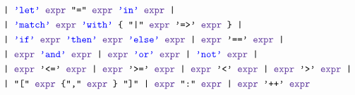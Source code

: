 \documentclass{article}
\begin{document}
\begin{align*}
	&\texttt{
		| \color{blue}'let' \color{black} 
		\color{RoyalPurple}expr \color{black} "=" \color{RoyalPurple}expr \color{black}	 \color{blue}'in' \color{black} \color{RoyalPurple}expr \color{black} 
		|}\\
	&\texttt{
		| \color{blue}'match' \color{black} \color{RoyalPurple}expr \color{black} \color{blue}'with' \color{black} \{ "|" \color{RoyalPurple}expr \color{black} '=>' \color{RoyalPurple}expr \color{black} \}
		|}\\
	&\texttt{
		| \color{blue}'if' \color{black} \color{RoyalPurple}expr \color{black} \color{blue}'then' \color{black} \color{RoyalPurple}expr \color{black} \color{blue}'else' \color{black} \color{RoyalPurple}expr \color{black}
		| \color{RoyalPurple}expr \color{black} '=='
		\color{RoyalPurple}expr \color{black}
		|}\\
	&\texttt{
		| \color{RoyalPurple}expr \color{black} \color{blue}'and' \color{black} \color{RoyalPurple}expr \color{black}
		| \color{RoyalPurple}expr \color{black} \color{blue} 'or' \color{black} \color{RoyalPurple}expr \color{black}
		| \color{blue} 'not' \color{black} \color{RoyalPurple}expr \color{black} 
		|}\\
	&\texttt{
		| \color{RoyalPurple}expr \color{black} '<=' \color{RoyalPurple}expr \color{black}
		| \color{RoyalPurple}expr \color{black} '>=' \color{RoyalPurple}expr \color{black}
		| \color{RoyalPurple}expr \color{black} '<' \color{RoyalPurple}expr \color{black}
		| \color{RoyalPurple}expr \color{black} '>' \color{RoyalPurple}expr \color{black}
		|}\\
	&\texttt{
		| "[" \color{RoyalPurple}expr \color{black} \{"," \color{RoyalPurple}expr \color{black}\} "]"
		| \color{RoyalPurple} expr \color{black} ":" \color{RoyalPurple}expr \color{black}
		| \color{RoyalPurple}expr \color{black} '++' \color{RoyalPurple}expr \color{black}
	}
	\end{align*}
\end{document}
